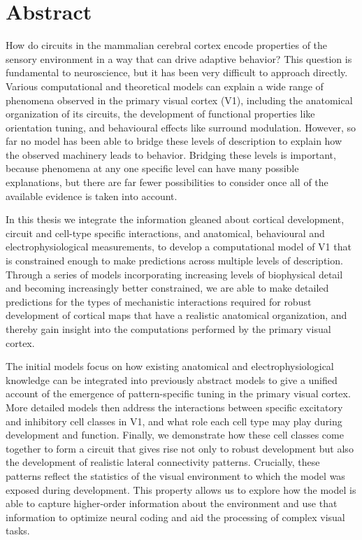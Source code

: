 
\begingroup
\let\clearpage\relax
\let\cleardoublepage\relax
\let\cleardoublepage\relax

\chapter*{Abstract} %
How do circuits in the mammalian cerebral cortex encode properties of
the sensory environment in a way that can drive adaptive behavior?
This question is fundamental to neuroscience, but it has been very
difficult to approach directly.  Various computational and theoretical
models can explain a wide range of phenomena observed in the primary
visual cortex (V1), including the anatomical organization of its
circuits, the development of functional properties like orientation
tuning, and behavioural effects like surround modulation. However, so
far no model has been able to bridge these levels of description to
explain how the observed machinery leads to behavior.  Bridging these
levels is important, because phenomena at any one specific level can
have many possible explanations, but there are far fewer possibilities
to consider once all of the available evidence is taken into account.

In this thesis we integrate the information gleaned about cortical
development, circuit and cell-type specific interactions, and
anatomical, behavioural and electrophysiological measurements, to
develop a computational model of V1 that is constrained enough to make
predictions across multiple levels of description. Through a series of
models incorporating increasing levels of biophysical detail and
becoming increasingly better constrained, we are able to make detailed
predictions for the types of mechanistic interactions required for
robust development of cortical maps that have a realistic anatomical
organization, and thereby gain insight into the computations performed
by the primary visual cortex.

The initial models focus on how existing anatomical and
electrophysiological knowledge can be integrated into previously
abstract models to give a unified account of the emergence of
pattern-specific tuning in the primary visual cortex.  More detailed
models then address the interactions between specific excitatory and
inhibitory cell classes in V1, and what role each cell type may play
during development and function. Finally, we demonstrate how these
cell classes come together to form a circuit that gives rise not only
to robust development but also the development of realistic lateral
connectivity patterns.  Crucially, these patterns reflect the
statistics of the visual environment to which the model was exposed
during development. This property allows us to explore how the model
is able to capture higher-order information about the environment and
use that information to optimize neural coding and aid the processing
of complex visual tasks.

